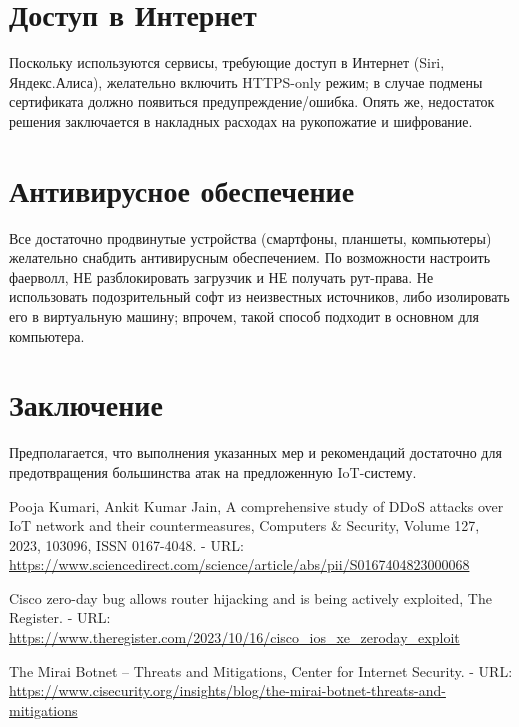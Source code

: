\documentclass{article}
\begin{document}
\section{Доступ в Интернет}
Поскольку используются сервисы, требующие доступ в Интернет (Siri, Яндекс.Алиса), желательно включить HTTPS-only режим; в случае подмены сертификата должно появиться предупреждение/ошибка. Опять же, недостаток решения заключается в накладных расходах на рукопожатие и шифрование.

\section{Антивирусное обеспечение}
Все достаточно продвинутые устройства (смартфоны, планшеты, компьютеры) желательно снабдить антивирусным обеспечением. По возможности настроить фаерволл, НЕ разблокировать загрузчик и НЕ получать рут-права. Не использовать подозрительный софт из неизвестных источников, либо изолировать его в виртуальную машину; впрочем, такой способ подходит в основном для компьютера.

\section{Заключение}
Предполагается, что выполнения указанных мер и рекомендаций достаточно для предотвращения большинства атак на предложенную IoT-систему. 

\begin{thebibliography}{3}

Pooja Kumari, Ankit Kumar Jain, A comprehensive study of DDoS attacks over IoT network and their countermeasures, Computers \& Security, Volume 127, 2023, 103096, ISSN 0167-4048. - URL: \url{https://www.sciencedirect.com/science/article/abs/pii/S0167404823000068}

Cisco zero-day bug allows router hijacking and is being actively exploited, The Register. - URL: \url{https://www.theregister.com/2023/10/16/cisco_ios_xe_zeroday_exploit}

The Mirai Botnet – Threats and Mitigations, Center for Internet Security. - URL: \url{https://www.cisecurity.org/insights/blog/the-mirai-botnet-threats-and-mitigations}
    
\end{thebibliography}
\end{document}
